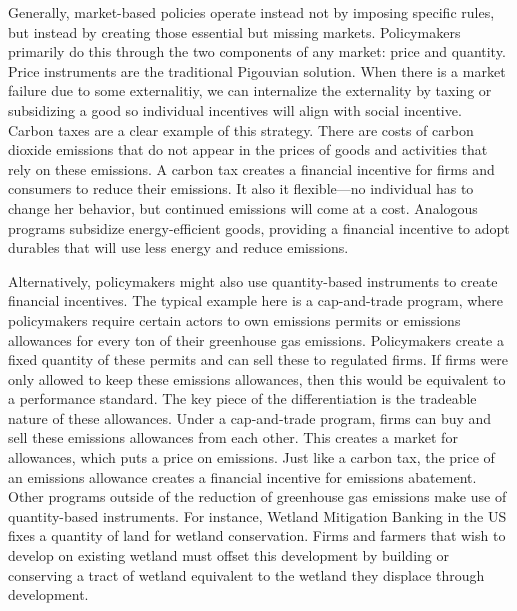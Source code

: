 Generally, market-based policies operate instead not by imposing specific rules, but instead by creating those essential but missing markets. Policymakers primarily do this through the two components of any market: price and quantity.  Price instruments are the traditional Pigouvian solution. When there is a market failure due to some externalitiy, we can internalize the externality by taxing or subsidizing a good so individual incentives will align with social incentive. Carbon taxes are a clear example of this strategy. There are costs of carbon dioxide emissions that do not appear in the prices of goods and activities that rely on these emissions. A carbon tax creates a financial incentive for firms and consumers to reduce their emissions. It also it flexible---no individual has to change her behavior, but continued emissions will come at a cost.  Analogous programs subsidize energy-efficient goods, providing a financial incentive to adopt durables that will use less energy and reduce emissions. 

Alternatively, policymakers might also use quantity-based instruments to create financial incentives. The typical example here is a cap-and-trade program, where policymakers require certain actors to own emissions permits or emissions allowances for every ton of their greenhouse gas emissions. Policymakers create a fixed quantity of these permits and can sell these to regulated firms. If firms were only allowed to keep these emissions allowances, then this would be equivalent to a performance standard. The key piece of the differentiation is the tradeable nature of these allowances. Under a cap-and-trade program, firms can buy and sell these emissions allowances from each other. This creates a market for allowances, which puts a price on emissions. Just like a carbon tax, the price of an emissions allowance creates a financial incentive for emissions abatement. Other programs outside of the reduction of greenhouse gas emissions make use of quantity-based instruments. For instance, Wetland Mitigation Banking in the US fixes a quantity of land for wetland conservation. Firms and farmers that wish to develop on existing wetland must offset this development by building or conserving a tract of wetland equivalent to the wetland they displace through development. 

        
